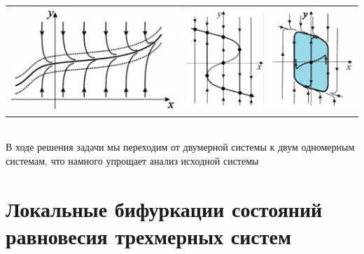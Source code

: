 \begin{multicols*}{2}
		\begin{tabular}{c | c}
			{\includegraphics[width=0.45\linewidth]{tk_img/sbmd_2.png}} & {\includegraphics[width=0.45\linewidth]{tk_img/sbmd.png}}
		\end{tabular}\\
		В ходе решения задачи мы переходим от двумерной системы к двум одномерным системам, что намного упрощает анализ  исходной системы
		
		\section{Локальные бифуркации состояний равновесия трехмерных систем}
\end{multicols*}
